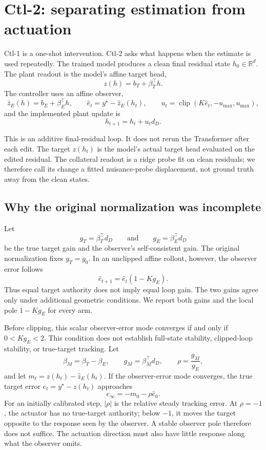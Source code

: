\section{Ctl-2: separating estimation from actuation}

Ctl-1 is a one-shot intervention. Ctl-2 asks what happens when the estimate is
used repeatedly. The trained model produces a clean final residual state
$h_0\in\mathbb{R}^d$. The plant readout is the model's affine target head,
\[
z(h)=b_T+\beta_T^\top h.
\]
The controller uses an affine observer,
\[
\widehat z_E(h)=b_E+\beta_E^\top h,
\qquad
\widehat e_t=y^\star-\widehat z_E(h_t),
\qquad
u_t=\operatorname{clip}(K\widehat e_t,-u_{\max},u_{\max}),
\]
and the implemented plant update is
\[
h_{t+1}=h_t+u_td_D.
\]

This is an additive final-residual loop. It does not rerun the Transformer after
each edit. The target $z(h_t)$ is the model's actual target head evaluated on
the edited residual. The collateral readout is a ridge probe fit on clean
residuals; we therefore call its change a fitted nuisance-probe displacement,
not ground truth away from the clean states.

\subsection{Why the original normalization was incomplete}

Let
\[
g_T=\beta_T^\top d_D
\qquad\text{and}\qquad
g_E=\beta_E^\top d_D
\]
be the true target gain and the observer's self-consistent gain. The original
normalization fixes $g_T=g_0$. In an unclipped affine rollout, however, the
observer error follows
\[
\widehat e_{t+1}=\widehat e_t(1-Kg_E).
\]
Thus equal target authority does not imply equal loop gain. The two gains agree
only under additional geometric conditions. We report both gains and the local
pole $1-Kg_E$ for every arm.

Before clipping, this scalar observer-error mode converges if and only if
$0<Kg_E<2$. This condition does not establish full-state stability, clipped-loop
stability, or true-target tracking. Let
\[
\beta_M=\beta_T-\beta_E,
\qquad
g_M=\beta_M^\top d_D,
\qquad
\rho=\frac{g_M}{g_E},
\]
and let $m_t=z(h_t)-\widehat z_E(h_t)$. If the observer-error mode converges,
the true target error $e_t=y^\star-z(h_t)$ approaches
\[
e_\infty=-m_0-\rho\widehat e_0.
\]
For an initially calibrated step, $|\rho|$ is the relative steady tracking
error. At $\rho=-1$, the actuator has no true-target authority; below $-1$,
it moves the target opposite to the response seen by the observer. A stable
observer pole therefore does not suffice. The actuation direction must also
have little response along what the observer omits.

